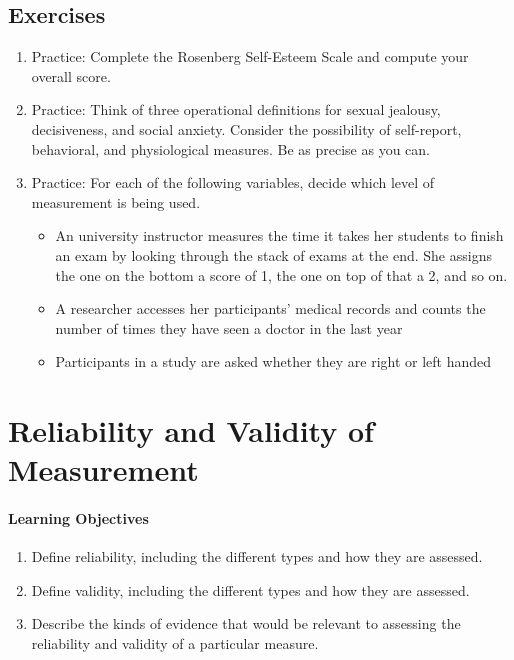 \subsection{Exercises}
\begin{fullwidth}
\begin{enumerate}
\item Practice: Complete the Rosenberg Self-Esteem Scale and compute your overall score.
\item Practice: Think of three operational definitions for sexual jealousy, decisiveness, and social anxiety. Consider the possibility of self-report, behavioral, and physiological measures. Be as precise as you can.
\item Practice: For each of the following variables, decide which level of measurement is being used.
\begin{itemize}
\item An university instructor measures the time it takes her students to finish an exam by looking through the stack of exams at the end. She assigns the one on the bottom a score of 1, the one on top of that a 2, and so on.
\item A researcher accesses her participants’ medical records and counts the number of times they have seen a doctor in the last year
\item Participants in a study are asked whether they are right or left handed
\end{itemize}
\end{enumerate}
\end{fullwidth}


\newpage
\section{Reliability and Validity of Measurement}

 \paragraph{Learning Objectives}
 \begin{enumerate}
 \item Define reliability, including the different types and how they are assessed.
 \item Define validity, including the different types and how they are assessed.
 \item Describe the kinds of evidence that would be relevant to assessing the reliability and validity of a particular measure.
  \end{enumerate}


